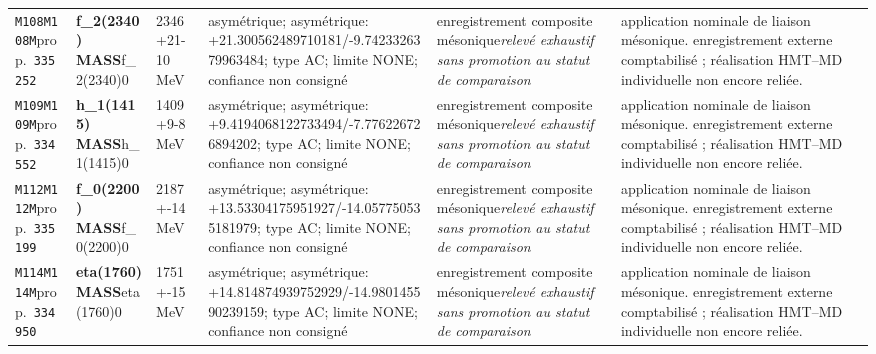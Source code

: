 \begin{landscape}
\begin{longtable}{L{1.85cm}L{4.45cm}L{2.35cm}L{4.05cm}L{3.35cm}L{7.15cm}}
\texttt{M108}\newline \texttt{M108M}\newline prop.\ \texttt{335252} & \textbf{f\_\allowbreak{}2(2340) MASS}\newline f\_\allowbreak{}2(2340)0 & 2346+21-10\,MeV & asymétrique; asymétrique: +21.300562489710181/-9.7423326379963484; type AC; limite NONE; confiance non consigné & enregistrement composite mésonique\newline \emph{relevé exhaustif sans promotion au statut de comparaison} & application nominale de liaison mésonique. enregistrement externe comptabilisé ; réalisation HMT--MD individuelle non encore reliée. \\
\texttt{M109}\newline \texttt{M109M}\newline prop.\ \texttt{334552} & \textbf{h\_\allowbreak{}1(1415) MASS}\newline h\_\allowbreak{}1(1415)0 & 1409+9-8\,MeV & asymétrique; asymétrique: +9.4194068122733494/-7.776226726894202; type AC; limite NONE; confiance non consigné & enregistrement composite mésonique\newline \emph{relevé exhaustif sans promotion au statut de comparaison} & application nominale de liaison mésonique. enregistrement externe comptabilisé ; réalisation HMT--MD individuelle non encore reliée. \\
\texttt{M112}\newline \texttt{M112M}\newline prop.\ \texttt{335199} & \textbf{f\_\allowbreak{}0(2200) MASS}\newline f\_\allowbreak{}0(2200)0 & 2187+-14\,MeV & asymétrique; asymétrique: +13.53304175951927/-14.057750535181979; type AC; limite NONE; confiance non consigné & enregistrement composite mésonique\newline \emph{relevé exhaustif sans promotion au statut de comparaison} & application nominale de liaison mésonique. enregistrement externe comptabilisé ; réalisation HMT--MD individuelle non encore reliée. \\
\texttt{M114}\newline \texttt{M114M}\newline prop.\ \texttt{334950} & \textbf{eta(1760) MASS}\newline eta(1760)0 & 1751+-15\,MeV & asymétrique; asymétrique: +14.814874939752929/-14.980145590239159; type AC; limite NONE; confiance non consigné & enregistrement composite mésonique\newline \emph{relevé exhaustif sans promotion au statut de comparaison} & application nominale de liaison mésonique. enregistrement externe comptabilisé ; réalisation HMT--MD individuelle non encore reliée. \\

\end{longtable}
\end{landscape}
